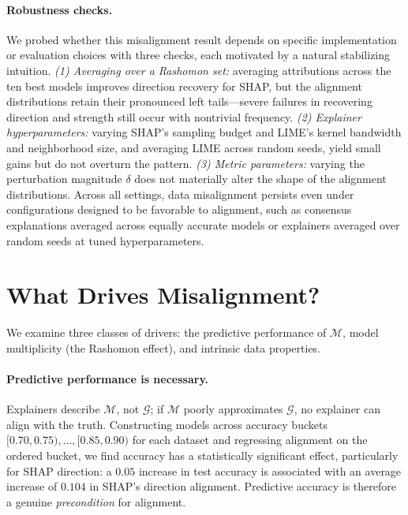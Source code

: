 \documentclass[12pt,letterpaper]{article}
\newcommand{\mG}{\mathcal{G}}
\newcommand{\mM}{\mathcal{M}}
\begin{document}
\paragraph{Robustness checks.}
We probed whether this misalignment result depends on specific implementation or
evaluation choices with three checks, each motivated by a natural stabilizing
intuition. \emph{(1) Averaging over a Rashomon set:} averaging attributions across
the ten best models improves direction recovery for SHAP, but the alignment
distributions retain their pronounced left tails---severe failures in recovering
direction and strength still occur with nontrivial frequency. \emph{(2) Explainer
hyperparameters:} varying SHAP's sampling budget and LIME's kernel bandwidth and
neighborhood size, and averaging LIME across random seeds, yield small gains but do
not overturn the pattern. \emph{(3) Metric parameters:} varying the perturbation
magnitude $\delta$ does not materially alter the shape of the alignment
distributions. Across all settings, data misalignment persists even under
configurations designed to be favorable to alignment, such as consensus
explanations averaged across equally accurate models or explainers averaged over
random seeds at tuned hyperparameters.

\section{What Drives Misalignment?}
\label{sec:factors}

We examine three classes of drivers: the predictive performance of $\mM$, model
multiplicity (the Rashomon effect), and intrinsic data properties.

\vspace{-3mm}
\paragraph{Predictive performance is necessary.}
Explainers describe $\mM$, not $\mG$; if $\mM$ poorly approximates $\mG$, no
explainer can align with the truth. Constructing models across accuracy buckets
$[0.70,0.75),\dots,[0.85,0.90)$ for each dataset and regressing alignment on the
ordered bucket, we find accuracy has a statistically significant effect,
particularly for SHAP direction: a $0.05$ increase in test accuracy is associated
with an average increase of $0.104$ in SHAP's direction alignment. Predictive
accuracy is therefore a genuine \emph{precondition} for alignment.
\end{document}

